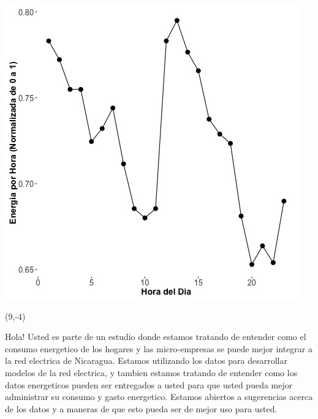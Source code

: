\documentclass{article}\usepackage[]{graphicx}\usepackage[]{color}
\newenvironment{knitrout}{}{} %
\begin{document}
\begin{knitrout}
\color{fgcolor}
\includegraphics[scale=0.75]{figure/A9_fplot_norm_median} 
\end{knitrout}

 \begin{textblock}{1}(9,-4)
\begin{minipage}{20em}
\begingroup

\endgroup
\end{minipage}
\end{textblock}



\vspace{70px}
\begin{knitrout}
Hola! Usted es parte de un estudio donde estamos tratando de entender como el consumo energetico de los hogares y las micro-empresas se puede mejor integrar a la red electrica de Nicaragua. Estamos utilizando los datos para desarrollar modelos de la red electrica, y tambien estamos tratando de entender como los datos energeticos pueden ser entregados a usted para que usted pueda mejor administrar su consumo y gasto energetico.  Estamos abiertos a sugerencias acerca de los datos y a maneras de que esto pueda ser de mejor uso para usted.
\end{knitrout}
\end{document}
